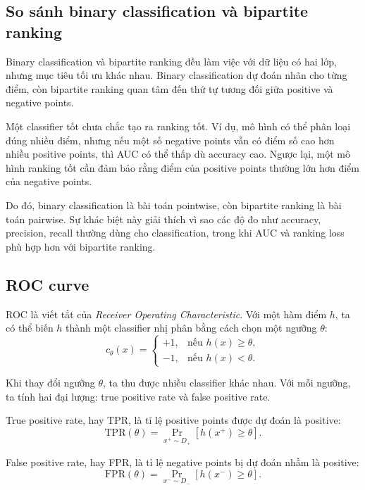 \subsection{So sánh binary classification và bipartite ranking}

Binary classification và bipartite ranking đều làm việc với dữ liệu có hai lớp, nhưng mục tiêu tối ưu khác nhau. Binary classification dự đoán nhãn cho từng điểm, còn bipartite ranking quan tâm đến thứ tự tương đối giữa positive và negative points.

Một classifier tốt chưa chắc tạo ra ranking tốt. Ví dụ, mô hình có thể phân loại đúng nhiều điểm, nhưng nếu một số negative points vẫn có điểm số cao hơn nhiều positive points, thì AUC có thể thấp dù accuracy cao. Ngược lại, một mô hình ranking tốt cần đảm bảo rằng điểm của positive points thường lớn hơn điểm của negative points.

Do đó, binary classification là bài toán pointwise, còn bipartite ranking là bài toán pairwise. Sự khác biệt này giải thích vì sao các độ đo như accuracy, precision, recall thường dùng cho classification, trong khi AUC và ranking loss phù hợp hơn với bipartite ranking.

\subsection{ROC curve}

ROC là viết tắt của \textit{Receiver Operating Characteristic}. Với một hàm điểm \(h\), ta có thể biến \(h\) thành một classifier nhị phân bằng cách chọn một ngưỡng \(\theta\):
\[
    c_{\theta}(x)
    =
    \begin{cases}
        +1, & \text{nếu } h(x)\geq \theta,\\
        -1, & \text{nếu } h(x)<\theta.
    \end{cases}
\]

Khi thay đổi ngưỡng \(\theta\), ta thu được nhiều classifier khác nhau. Với mỗi ngưỡng, ta tính hai đại lượng: true positive rate và false positive rate.

True positive rate, hay TPR, là tỉ lệ positive points được dự đoán là positive:
\begin{equation}
    \mathrm{TPR}(\theta)
    =
    \Pr_{x^{+}\sim D_{+}}
    \left[
        h(x^{+})\geq \theta
    \right].
    \label{eq:section6-tpr}
\end{equation}

False positive rate, hay FPR, là tỉ lệ negative points bị dự đoán nhầm là positive:
\begin{equation}
    \mathrm{FPR}(\theta)
    =
    \Pr_{x^{-}\sim D_{-}}
    \left[
        h(x^{-})\geq \theta
    \right].
    \label{eq:section6-fpr}
\end{equation}

